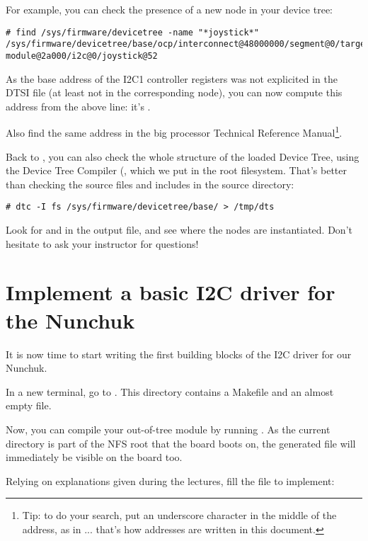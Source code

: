 For example, you can check the presence of a new  node in
your device tree:

{\small
\begin{verbatim}
# find /sys/firmware/devicetree -name "*joystick*"
/sys/firmware/devicetree/base/ocp/interconnect@48000000/segment@0/target-module@2a000/i2c@0/joystick@52
\end{verbatim}
}

As the base address of the I2C1 controller registers was not explicited
in the DTSI file (at least not in the corresponding node), you can now
compute this address from the above line: it's .

Also find the same address in the big processor Technical Reference
Manual\footnote{Tip: to do your search, put an underscore character
in the middle of the address, as in ... that's how
addresses are written in this document.}.

Back to , you can also check the whole
structure of the loaded Device Tree, using the Device Tree Compiler
(, which we put in the root filesystem. That's better than
checking the source files and includes in the source directory:

\begin{verbatim}
# dtc -I fs /sys/firmware/devicetree/base/ > /tmp/dts
\end{verbatim}

Look for  and  in the output file,
and see where the nodes are instantiated. Don't hesitate to ask your
instructor for questions!

\section{Implement a basic I2C driver for the Nunchuk}

It is now time to start writing the first building blocks of the I2C
driver for our Nunchuk.

In a new terminal, go to
.  This directory
contains a Makefile and an almost empty  file.

Now, you can compile your out-of-tree module by running . As
the current directory is part of the NFS root that the board boots on,
the generated  file will immediately be visible on the board
too.

Relying on explanations given during the lectures, fill the
 file to implement:

